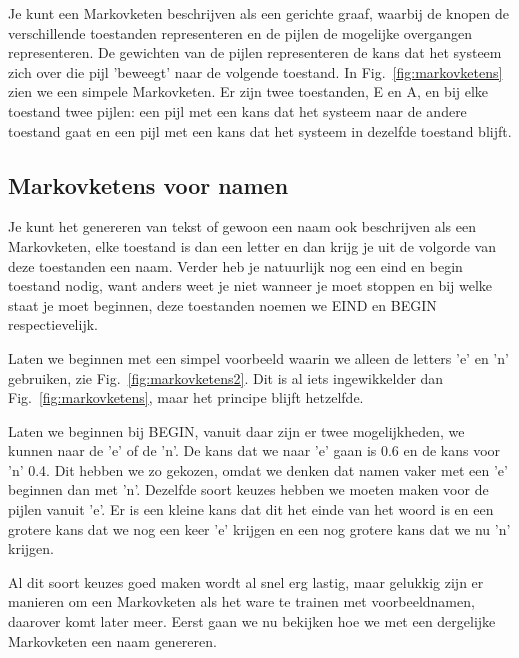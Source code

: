 \documentclass{article}
\begin{document}
Je kunt een Markovketen beschrijven als een gerichte graaf, waarbij de knopen de verschillende toestanden representeren en de pijlen de mogelijke overgangen representeren. De gewichten van de pijlen representeren de kans dat het systeem zich over die pijl 'beweegt' naar de volgende toestand. In Fig.~\ref{fig:markovketens} zien we een simpele Markovketen. Er zijn twee toestanden, E en A, en bij elke toestand twee pijlen: een pijl met een kans dat het systeem naar de andere toestand gaat en een pijl met een kans dat het systeem in dezelfde toestand blijft.

\subsection{Markovketens voor namen}

Je kunt het genereren van tekst of gewoon een naam ook beschrijven als een Markovketen, elke toestand is dan een letter en dan krijg je uit de volgorde van deze toestanden een naam. Verder heb je natuurlijk nog een eind en begin toestand nodig, want anders weet je niet wanneer je moet stoppen en bij welke staat je moet beginnen, deze toestanden noemen we EIND en BEGIN respectievelijk.

Laten we beginnen met een simpel voorbeeld waarin we alleen de letters 'e' en 'n' gebruiken, zie Fig.~\ref{fig:markovketens2}. Dit is al iets ingewikkelder dan Fig.~\ref{fig:markovketens}, maar het principe blijft hetzelfde.

Laten we beginnen bij BEGIN, vanuit daar zijn er twee mogelijkheden, we kunnen naar de 'e' of de 'n'. De kans dat we naar 'e' gaan is 0.6 en de kans voor 'n' 0.4. Dit hebben we zo gekozen, omdat we denken dat namen vaker met een 'e' beginnen dan met 'n'. Dezelfde soort keuzes hebben we moeten maken voor de pijlen vanuit 'e'. Er is een kleine kans dat dit het einde van het woord is en een grotere kans dat we nog een keer 'e' krijgen en een nog grotere kans dat we nu 'n' krijgen.

Al dit soort keuzes goed maken wordt al snel erg lastig, maar gelukkig zijn er manieren om een Markovketen als het ware te trainen met voorbeeldnamen, daarover komt later meer. Eerst gaan we nu bekijken hoe we met een dergelijke Markovketen een naam genereren.
\end{document}
